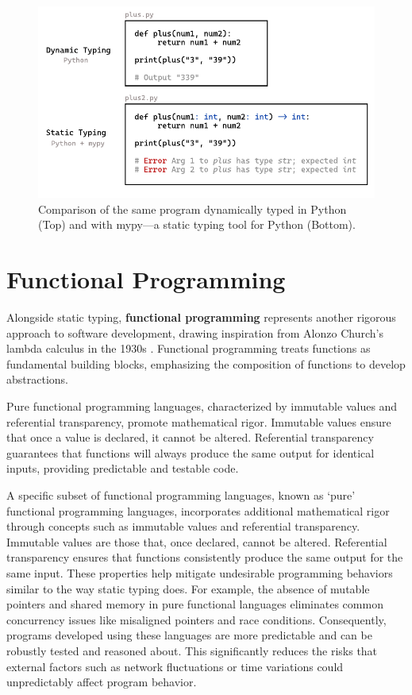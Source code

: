 \begin{figure}[hbt]
  \includegraphics[width=\linewidth]{TypedVsUntyped.pdf}
  \caption{
    \label{fig:typed-vs-untyped}
    Comparison of the same program dynamically typed in Python (Top) and with mypy—a static typing tool for Python (Bottom).
    }
\end{figure}



\section{Functional Programming}

Alongside static typing, \textbf{functional programming} represents another rigorous approach to software development, drawing inspiration from Alonzo Church's lambda calculus in the 1930s \cite{Church1985-bx}. Functional programming treats functions as fundamental building blocks, emphasizing the composition of functions to develop abstractions.

Pure functional programming languages, characterized by immutable values and referential transparency, promote mathematical rigor. Immutable values ensure that once a value is declared, it cannot be altered. Referential transparency guarantees that functions will always produce the same output for identical inputs, providing predictable and testable code.

 A specific subset of functional programming languages, known as `pure' functional programming languages, incorporates additional mathematical rigor through concepts such as immutable values and referential transparency. Immutable values are those that, once declared, cannot be altered. Referential transparency ensures that functions consistently produce the same output for the same input. These properties help mitigate undesirable programming behaviors similar to the way static typing does. For example, the absence of mutable pointers and shared memory in pure functional languages eliminates common concurrency issues like misaligned pointers and race conditions. Consequently, programs developed using these languages are more predictable and can be robustly tested and reasoned about. This significantly reduces the risks that external factors such as network fluctuations or time variations could unpredictably affect program behavior.

